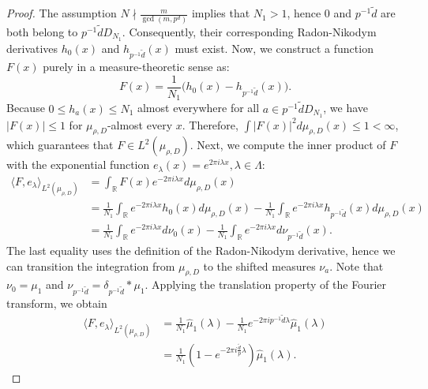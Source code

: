 \documentclass[10pt,a4paper]{amsart}
\begin{document}
\begin{proof}
The assumption $N\nmid\frac{m}{\gcd(m,p^d)}$ implies that $N_1>1$, hence
 $0$ and $p^{-1}\tilde{d}$ are both belong to $p^{-1}\tilde{d}D_{N_1}$. Consequently, their corresponding Radon-Nikodym derivatives $h_0(x)$ and $h_{p^{-1}\tilde{d}}(x)$ must exist.
Now, we construct a function $F(x)$ purely in a measure-theoretic sense as:
\begin{equation}\label{3.13}
	F(x) = \frac{1}{N_1} \Big( h_0(x) - h_{p^{-1}\tilde{d}}(x) \Big).
\end{equation}
Because $0 \le h_a(x) \le N_1$ almost everywhere for all $a\in p^{-1}\tilde{d}D_{N_1}$, we  have $|F(x)| \le 1$ for $\mu_{\rho,D}$-almost every $x$. Therefore, $\int |F(x)|^2 d\mu_{\rho,D}(x) \le 1 < \infty$, which  guarantees that $F \in L^2(\mu_{\rho,D})$. 
Next, we compute the inner product of $F$ with the exponential function $e_\lambda(x) = e^{2\pi i \lambda x},\lambda\in \Lambda$: 
\begin{equation*}
	\begin{aligned}
		\langle F, e_\lambda \rangle_{L^2(\mu_{\rho,D})} &= \int_{\mathbb{R}} F(x) e^{-2\pi i \lambda x} d\mu_{\rho,D}(x) \\
		&= \frac{1}{N_1} \int_{\mathbb{R}} e^{-2\pi i \lambda x} h_0(x) d\mu_{\rho,D}(x) - \frac{1}{N_1} \int_{\mathbb{R}} e^{-2\pi i \lambda x} h_{p^{-1}\tilde{d}}(x) d\mu_{\rho,D}(x) \\
		&= \frac{1}{N_1} \int_{\mathbb{R}} e^{-2\pi i \lambda x} d\nu_0(x) - \frac{1}{N_1} \int_{\mathbb{R}} e^{-2\pi i \lambda x} d\nu_{p^{-1}\tilde{d}}(x).
	\end{aligned}
\end{equation*}
The last equality uses  the definition of the Radon-Nikodym derivative, hence we can transition the integration from  $\mu_{\rho,D}$ to the shifted measures $\nu_a$.
Note that $\nu_0 = \mu_1$ and $\nu_{p^{-1}\tilde{d}} = \delta_{p^{-1}\tilde{d}} \ast \mu_1$.  Applying the translation property of the Fourier transform, we obtain
\begin{equation*}
	\begin{aligned}
		\langle F, e_\lambda \rangle_{L^2(\mu_{\rho,D})} &= \frac{1}{N_1} \widehat{\mu}_1(\lambda) - \frac{1}{N_1} e^{-2\pi i p^{-1}\tilde{d} \lambda} \widehat{\mu}_1(\lambda) \\
		&= \frac{1}{N_1} \left( 1 - e^{-2\pi i \frac{\tilde{d}}{p} \lambda} \right) \widehat{\mu}_1(\lambda).
	\end{aligned}

\end{equation*}
\end{proof}
\end{document}
